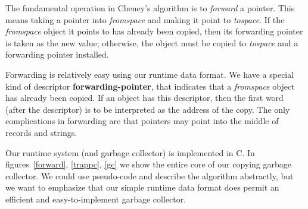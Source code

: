 The fundamental operation in Cheney's algorithm is to {\em forward} a pointer.
This means taking a pointer into {\em fromspace} and making it point to {\em tospace}.
If the {\em fromspace} object it points to has already been copied, then its
forwarding pointer is taken as the new value; otherwise, the object must
be copied to {\em tospace} and a forwarding pointer installed.

Forwarding is relatively easy using our runtime data format.  We have a special
kind of descriptor {\bf forwarding-pointer}, that indicates that a {\em fromspace}
object has already been copied.  If an object has this descriptor, then
the first word (after the descriptor) is to be interpreted as the address
of the copy.  The only complications in forwarding are that pointers
may point into the middle of records and strings.

Our runtime system (and garbage collector) is implemented in C.
In figures~\ref{forward}, \ref{trappc}, \ref{gc} we show the entire
core of our copying garbage collector.  We could use pseudo-code
and describe the algorithm abstractly, but we want to emphasize that
our simple runtime data format does permit an efficient and easy-to-implement
garbage collector.

